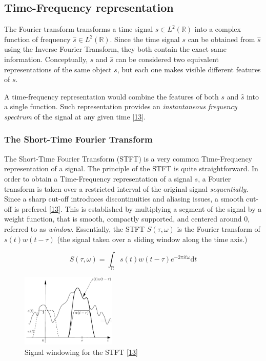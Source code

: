 \documentclass[american,]{article}
\theoremstyle{definition}
\theoremstyle{definition}
\theoremstyle{definition}
\theoremstyle{remark}
\begin{document}
\hypertarget{time-frequency-representation}{%
\subsection{Time-Frequency representation}\label{time-frequency-representation}}

The Fourier transform transforms a time signal \(s\in L^2(\mathbb{R})\)
into a complex function of frequency \(\hat s\in L^2(\mathbb{R})\).
Since the time signal \(s\) can be obtained from \(\hat s\)
using the Inverse Fourier Transform, they both contain
the exact same information.
Conceptually, \(s\) and \(\hat s\) can be considered two equivalent
representations of the same object \(s\), but each one
makes visible different features of \(s\).

A time-frequency representation would combine the features
of both \(s\) and \(\hat s\) into a single function.
Such representation provides an \emph{instantaneous frequency spectrum}
of the signal at any given time {[}\protect\hyperlink{ref-grochenig2001}{13}{]}.

\hypertarget{the-short-time-fourier-transform}{%
\subsubsection{The Short-Time Fourier Transform}\label{the-short-time-fourier-transform}}

The Short-Time Fourier Transform (STFT) is a very common
Time-Frequency representation of a signal.
The principle of the STFT is quite straightforward.
In order to obtain a Time-Frequency representation of a signal \(s\),
a Fourier transform is taken over a restricted interval
of the original signal \emph{sequentially}.
Since a sharp cut-off introduces discontinuities and aliasing issues,
a smooth cut-off is prefered {[}\protect\hyperlink{ref-grochenig2001}{13}{]}.
This is established by multiplying a segment of the signal by a weight function,
that is smooth, compactly supported, and centered around \(0\),
referred to as \emph{window}.
Essentially, the STFT \(S(\tau,\omega)\) is the Fourier transform of \(s(t)w(t-\tau)\)
(the signal taken over a sliding window along the time axis.)

\begin{equation}
S(\tau,\omega) = \int_\mathbb{R}s(t)w(t-\tau)e^{-2\pi it\omega} \mathrm{d}t
\end{equation}

\begin{figure}
\centering
\includegraphics[width=0.4\textwidth,height=\textheight]{img/stft_grochenig.png}
\caption{Signal windowing for the STFT {[}\protect\hyperlink{ref-grochenig2001}{13}{]}}
\end{figure}
\end{document}
